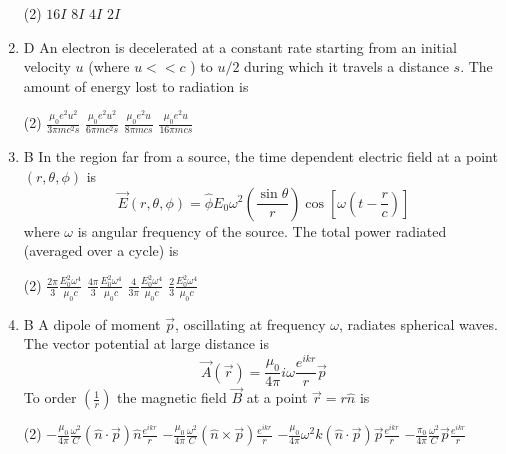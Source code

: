 \begin{enumerate}
{}
 \begin{tasks}(2)
	\task[\textbf{a.}] $16 I$
	\task[\textbf{b.}]$8 I$
	\task[\textbf{c.}]$4 I$
	\task[\textbf{d.}] $2 I$
\end{tasks}
\item D An electron is decelerated at a constant rate starting from an initial velocity $u$ (where $u<<c$ ) to $u / 2$ during which it travels a distance $s$. The amount of energy lost to radiation is
{}
 \begin{tasks}(2)
	\task[\textbf{a.}]$\frac{\mu_{0} e^{2} u^{2}}{3 \pi m c^{2} s}$
	\task[\textbf{b.}]$\frac{\mu_{0} e^{2} u^{2}}{6 \pi m c^{2} s}$
	\task[\textbf{c.}]$\frac{\mu_{0} e^{2} u}{8 \pi m c s}$
	\task[\textbf{d.}] $\frac{\mu_{0} e^{2} u}{16 \pi m c s}$
\end{tasks}
\item B In the region far from a source, the time dependent electric field at a point $(r, \theta, \phi)$ is
$$
\vec{E}(r, \theta, \phi)=\hat{\phi} E_{0} \omega^{2}\left(\frac{\sin \theta}{r}\right) \cos \left[\omega\left(t-\frac{r}{c}\right)\right]
$$
where $\omega$ is angular frequency of the source. The total power radiated (averaged over a cycle) is
{}
 \begin{tasks}(2)
	\task[\textbf{a.}]$\frac{2 \pi}{3} \frac{E_{0}^{2} \omega^{4}}{\mu_{0} c}$
	\task[\textbf{b.}]$\frac{4 \pi}{3} \frac{E_{0}^{2} \omega^{4}}{\mu_{0} c}$
	\task[\textbf{c.}] $\frac{4}{3 \pi} \frac{E_{0}^{2} \omega^{4}}{\mu_{0} c}$
	\task[\textbf{d.}] $\frac{2}{3} \frac{E_{0}^{2} \omega^{4}}{\mu_{0} c}$
\end{tasks}
\item B A dipole of moment $\vec{p}$, oscillating at frequency $\omega$, radiates spherical waves. The vector potential at large distance is
$$
\vec{A}(\vec{r})=\frac{\mu_{0}}{4 \pi} i \omega \frac{e^{i k r}}{r} \vec{p}
$$
To order $\left(\frac{1}{r}\right)$ the magnetic field $\vec{B}$ at a point $\vec{r}=r \hat{n}$ is
{}
 \begin{tasks}(2)
	\task[\textbf{a.}]$-\frac{\mu_{0}}{4 \pi} \frac{\omega^{2}}{C}(\hat{n} \cdot \vec{p}) \hat{n} \frac{e^{i k r}}{r}$
	\task[\textbf{b.}] $-\frac{\mu_{0}}{4 \pi} \frac{\omega^{2}}{C}(\hat{n} \times \vec{p}) \frac{e^{i k r}}{r}$
	\task[\textbf{c.}] $-\frac{\mu_{0}}{4 \pi} \omega^{2} k(\hat{n} \cdot \vec{p}) \vec{p} \frac{e^{i k r}}{r}$
	\task[\textbf{d.}] $-\frac{\pi_{0}}{4 \pi} \frac{\omega^{2}}{C} \vec{p} \frac{e^{i k r}}{r}$
\end{tasks}

\end{enumerate}
